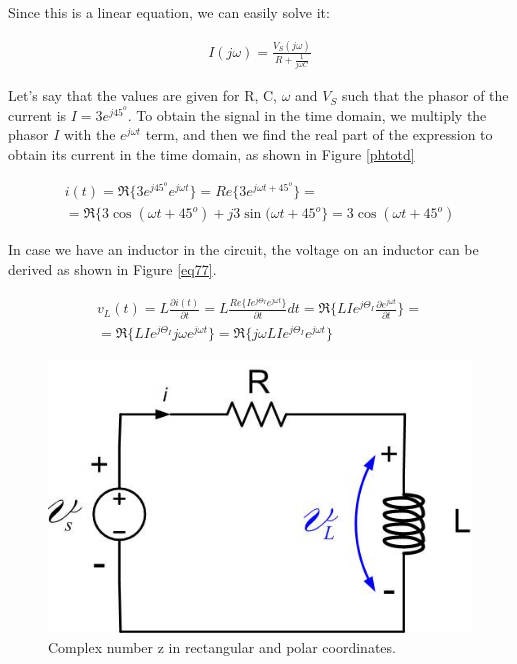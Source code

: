 \documentclass{ximera}
\begin{document}
Since this is a linear equation, we can easily solve it:


\begin{eqnarray}
I (j \omega) = \frac{V_S(j \omega)}{ R    + \frac{1}{j \omega C} } \label{pheq}
\end{eqnarray} 



Let's say that the values  are given for R, C,  $\omega$  and $V_S$ such that the phasor of the current is  $I=3 e^{j 45^o}$. To obtain the signal in the time domain,  we   multiply the phasor $I$ with the $ e^{j\omega t}$ term, and  then we find
the real part of the expression to obtain its current in the time domain, as shown in Figure \ref{phtotd}


\begin{eqnarray}
i(t) = \Re\{ 3 e^{j 45^o}  e^{j\omega t} \} =  Re\{3 e^{j \omega t + 45^o}  \} = \nonumber \\ = \Re \{ 3 \cos (\omega t + 45^o ) + j 3 \sin (\omega t + 45^o \} = 3  \cos (\omega t + 45^o ) \label{phtotd}
\end{eqnarray}

In case we have an inductor in the circuit, the voltage on an inductor can be derived as shown in Figure \ref{eq77}. 


\begin{eqnarray}
v_L(t) = L \frac{\partial{ i(t)}}{\partial t}  =L  \frac{ Re\{    I e^{j \Theta_I} e^{j \omega t}\}}{\partial t}  dt  = \Re\{  LI e^{j \Theta_I} \frac{ \partial e^{j \omega t}}{\partial t} \} =  \nonumber \\ = \Re\{  LI e^{j  \Theta_I}  j  \omega e^{j \omega t} \} =  \Re \{  j  \omega       LI e^{j  \Theta_I}    e^{j \omega t}   \}      \label{eq77} 
\end{eqnarray}


\begin{figure}[htbp]
\begin{center}
\includegraphics[scale=0.3]{../jpg/RLnew.jpg}
\end{center}
\caption{Complex number z in rectangular and polar coordinates.}
\label{RLcirc}
\end{figure}
\end{document}
